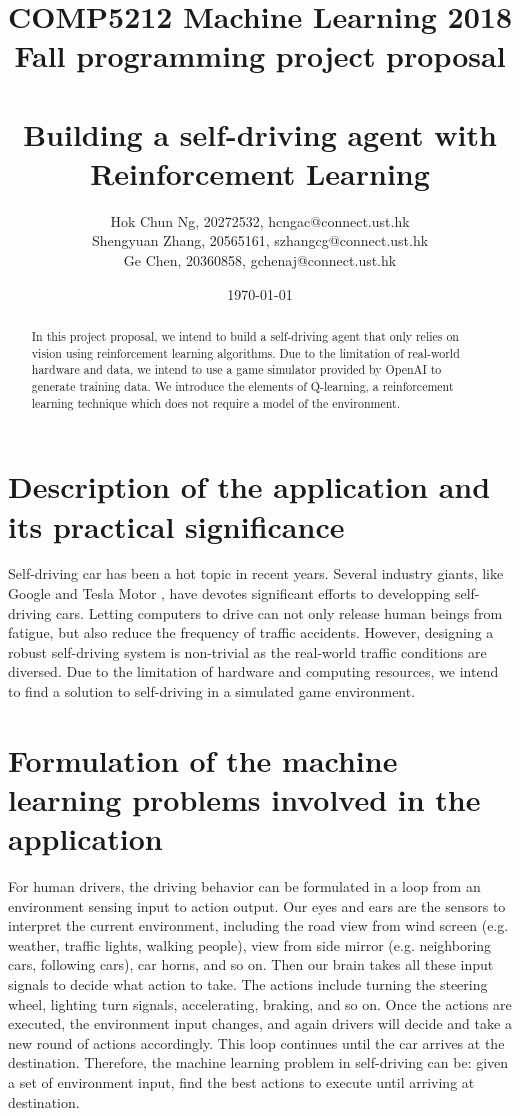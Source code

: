 \documentclass[a4paper]{article}
\title{COMP5212 Machine Learning 2018 Fall programming project proposal \\
       \ \ \ \ \\
       Building a self-driving agent with Reinforcement Learning}
\author{Hok Chun Ng, 20272532, hcngac@connect.ust.hk \\
        Shengyuan Zhang, 20565161, szhangcg@connect.ust.hk \\
        Ge Chen, 20360858, gchenaj@connect.ust.hk}
\date{\today}
\begin{document}
\maketitle

\begin{abstract}
In this project proposal, we intend to build a self-driving agent that only
relies on vision using reinforcement learning algorithms. Due to the limitation
of real-world hardware and data, we intend to use a game simulator provided by
OpenAI \cite{gym} to generate training data. We introduce the elements of Q-learning, a
reinforcement learning technique which does not require a model of the environment.
\end{abstract}

\section{Description of the application and its practical significance}

Self-driving car has been a hot topic in recent years. Several industry giants,
like Google \cite{google} and Tesla Motor \cite{tesla}, have devotes significant
efforts to developping self-driving cars. Letting computers to drive
can not only release human beings from fatigue, but also reduce the frequency of
traffic accidents. However, designing a robust self-driving system is non-trivial
as the real-world traffic conditions are diversed. Due to the limitation of
hardware and computing resources, we intend to find a solution to self-driving in
a simulated game environment.


\section{Formulation of the machine learning problems involved in the application}

For human drivers, the driving behavior can be formulated in a loop from an environment
sensing input to action output. Our eyes and ears are the sensors to interpret the
current environment, including the road view from wind screen (e.g. weather, traffic lights,
walking people), view from side mirror (e.g. neighboring cars, following cars),
car horns, and so on. Then our brain takes all these input signals to decide what action
to take. The actions include turning the steering wheel, lighting turn signals, accelerating,
braking, and so on. Once the actions are executed, the environment input changes, and again
drivers will decide and take a new round of actions accordingly. This loop continues until
the car arrives at the destination. Therefore, the machine learning problem in self-driving
can be: given a set of environment input, find the best actions to execute until arriving
at destination.
\end{document}
